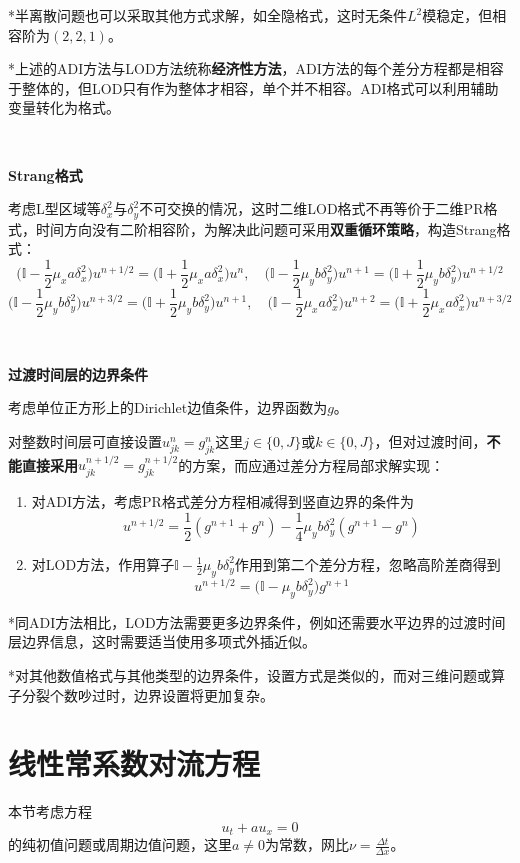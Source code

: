 \documentclass[a4paper,UTF8,fontset=windows]{ctexart}
\begin{document}
*半离散问题也可以采取其他方式求解，如全隐格式，这时无条件$L^2$模稳定，但相容阶为$(2,2,1)$。

*上述的ADI方法与LOD方法统称\textbf{经济性方法}，ADI方法的每个差分方程都是相容于整体的，但LOD只有作为整体才相容，单个并不相容。ADI格式可以利用辅助变量转化为格式。

\

\textbf{Strang格式}

考虑L型区域等$\delta_x^2$与$\delta_y^2$不可交换的情况，这时二维LOD格式不再等价于二维PR格式，时间方向没有二阶相容阶，为解决此问题可采用\textbf{双重循环策略}，构造Strang格式：
$$\bigg(\mathbb{I}-\frac{1}{2}\mu_xa\delta_x^2\bigg)u^{n+1/2}=\bigg(\mathbb{I}+\frac{1}{2}\mu_xa\delta_x^2\bigg)u^n,\quad\bigg(\mathbb{I}-\frac{1}{2}\mu_yb\delta_y^2\bigg)u^{n+1}=\bigg(\mathbb{I}+\frac{1}{2}\mu_yb\delta_y^2\bigg)u^{n+1/2}$$
$$\bigg(\mathbb{I}-\frac{1}{2}\mu_yb\delta_y^2\bigg)u^{n+3/2}=\bigg(\mathbb{I}+\frac{1}{2}\mu_yb\delta_y^2\bigg)u^{n+1},\quad\bigg(\mathbb{I}-\frac{1}{2}\mu_xa\delta_x^2\bigg)u^{n+2}=\bigg(\mathbb{I}+\frac{1}{2}\mu_xa\delta_x^2\bigg)u^{n+3/2}$$

\

\textbf{过渡时间层的边界条件}

考虑单位正方形上的Dirichlet边值条件，边界函数为$g$。

对整数时间层可直接设置$u_{jk}^n=g_{jk}^n$这里$j\in\{0,J\}$或$k\in\{0,J\}$，但对过渡时间，\textbf{不能直接采用}$u_{jk}^{n+1/2}=g_{jk}^{n+1/2}$的方案，而应通过差分方程局部求解实现：
\begin{enumerate}
    \item 对ADI方法，考虑PR格式差分方程相减得到竖直边界的条件为
    $$u^{n+1/2}=\frac{1}{2}(g^{n+1}+g^n)-\frac{1}{4}\mu_yb\delta_y^2(g^{n+1}-g^n)$$
    \item 对LOD方法，作用算子$\mathbb{I}-\frac{1}{2}\mu_yb\delta_y^2$作用到第二个差分方程，忽略高阶差商得到
    $$u^{n+1/2}=\big(\mathbb{I}-\mu_yb\delta_y^2\big)g^{n+1}$$
\end{enumerate}

*同ADI方法相比，LOD方法需要更多边界条件，例如还需要水平边界的过渡时间层边界信息，这时需要适当使用多项式外插近似。

*对其他数值格式与其他类型的边界条件，设置方式是类似的，而对三维问题或算子分裂个数吵过时，边界设置将更加复杂。

\section{线性常系数对流方程}
本节考虑方程
$$u_t+au_x=0$$
的纯初值问题或周期边值问题，这里$a\ne0$为常数，网比$\nu=\frac{\Delta t}{\Delta x}$。
\end{document}
